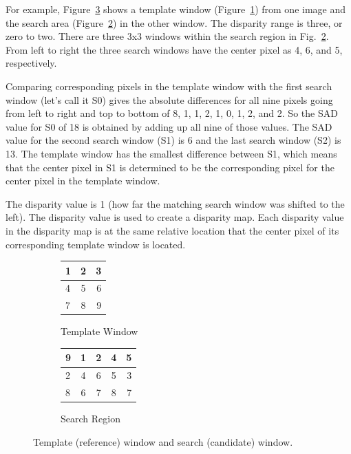 For example, Figure~\ref{fig:windows} shows a template window (Figure~\ref{fig:template}) from one image and the search area (Figure~\ref{fig:search}) in the other window. The disparity range is three, or zero to two. There are three 3x3 windows within the search region in Fig.~\ref{fig:search}. From left to right the three search windows have the center pixel as 4, 6, and 5, respectively. 

Comparing corresponding pixels in the template window with the first search window (let's call it S0) gives the absolute differences for all nine pixels going from left to right and top to bottom of 8, 1, 1, 2, 1, 0, 1, 2, and 2. So the SAD value for S0 of 18 is obtained by adding up all nine of those values. The SAD value for the second search window (S1) is 6 and the last search window (S2) is 13. The template window has the smallest difference between S1, which means that the center pixel in S1 is determined to be the corresponding pixel for the center pixel in the template window. 

The disparity value is 1 (how far the matching search window was shifted to the left). The disparity value is used to create a disparity map. Each disparity value in the disparity map is at the same relative location that the center pixel of its corresponding template window is located.

\begin{figure}
\begin{center}
	\begin{subfigure}{0.3\textwidth}
		\begin{center}				
			\begin{tabular}{|l|c|r|}
				\hline
				1 & 2 & 3 \\\hline
	  			4 & 5 & 6 \\\hline
		    	7 & 8 & 9 \\
		    	\hline
			\end{tabular}
		\end{center}
		\caption{Template Window}
		\label{fig:template}
	\end{subfigure}
	\begin{subfigure}{0.3\textwidth}
		\begin{center}		
			\begin{tabular}{|l|c|c|c|r|}
				\hline
				9 & 1 & 2 & 4 & 5 \\\hline
		  		2 & 4 & 6 & 5 & 3 \\\hline
		    	8 & 6 & 7 & 8 & 7 \\
		    	\hline
			\end{tabular}
		\end{center}
		\caption{Search Region}
		\label{fig:search}
	\end{subfigure}
	\captionfonts
	\caption{Template (reference) window and search (candidate) window.}
	\label{fig:windows}
\end{center}
\end{figure}
